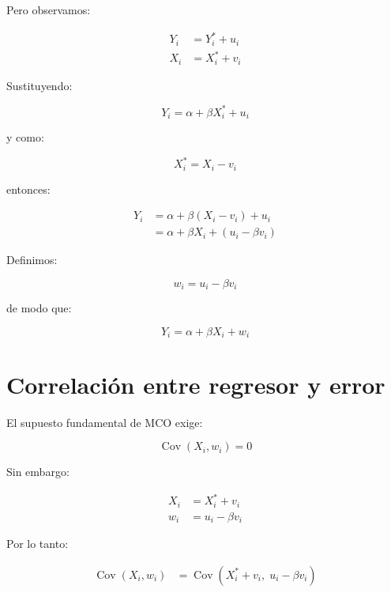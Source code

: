 \documentclass[12pt,letterpaper]{article}
\newcommand{\Cov}{\operatorname{Cov}}
\begin{document}
Pero observamos:

\begin{align}
Y_i &= Y_i^{*}+u_i \\
X_i &= X_i^{*}+v_i
\end{align}

Sustituyendo:

\begin{equation}
Y_i
=
\alpha+\beta X_i^{*}+u_i
\end{equation}

y como:

\begin{equation}
X_i^{*}=X_i-v_i
\end{equation}

entonces:

\begin{align}
Y_i
&=
\alpha+\beta(X_i-v_i)+u_i \\[4pt]
&=
\alpha+\beta X_i+(u_i-\beta v_i)
\end{align}

Definimos:

\begin{equation}
w_i=u_i-\beta v_i
\end{equation}

de modo que:

\begin{equation}
Y_i=\alpha+\beta X_i+w_i
\end{equation}

\section{Correlación entre regresor y error}

El supuesto fundamental de MCO exige:

\begin{equation}
\Cov(X_i,w_i)=0
\end{equation}

Sin embargo:

\begin{align}
X_i &= X_i^{*}+v_i \\
w_i &= u_i-\beta v_i
\end{align}

Por lo tanto:

\begin{align}
\Cov(X_i,w_i)
&=
\Cov(X_i^{*}+v_i,\;u_i-\beta v_i)
\end{align}
\end{document}
